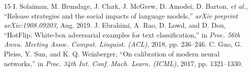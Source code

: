 \documentclass[conference]{IEEEtran}
\begin{document}
\begin{thebibliography}{15}
 I. Solaiman, M. Brundage, J. Clark, J. McGrew, D. Amodei, D. Barton, \textit{et al.}, ``Release strategies and the social impacts of language models,'' \textit{arXiv preprint arXiv:1908.09203}, Aug. 2019.
 J. Ebrahimi, A. Rao, D. Lowd, and D. Dou, ``HotFlip: White-box adversarial examples for text classification,'' in \textit{Proc. 56th Annu. Meeting Assoc. Comput. Linguist. (ACL)}, 2018, pp. 236--246.
 C. Guo, G. Pleiss, Y. Sun, and K. Q. Weinberger, ``On calibration of modern neural networks,'' in \textit{Proc. 34th Int. Conf. Mach. Learn. (ICML)}, 2017, pp. 1321--1330.
\end{thebibliography}
\end{document}

